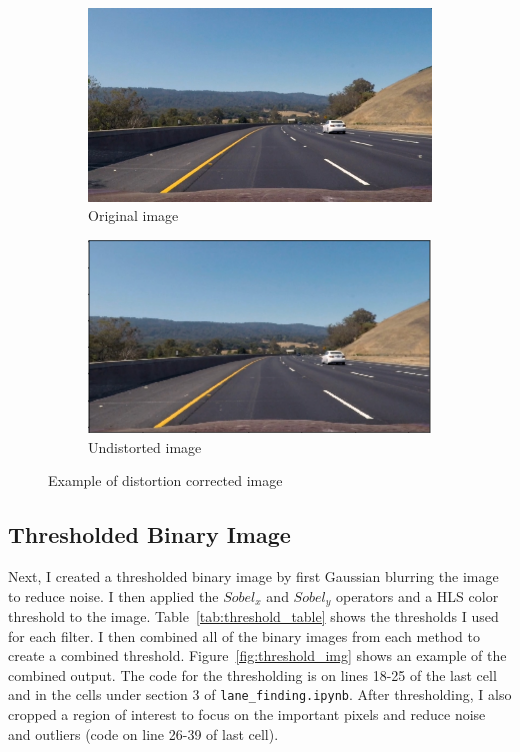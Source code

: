 \documentclass[12pt]{article}
\begin{document}
\begin{figure}[h]
\centering
\begin{subfigure}{.5\textwidth}
  \centering
  \includegraphics[width=1\linewidth]{test3.jpg}
  \caption{Original image}
\end{subfigure}%
\begin{subfigure}{.5\textwidth}
  \centering
  \includegraphics[width=1\linewidth]{undistorted_test.png}
  \caption{Undistorted image}
\end{subfigure}
\caption{Example of distortion corrected image}
\label{fig:undistorted_img}
\end{figure}

\subsection{Thresholded Binary Image}
Next, I created a thresholded binary image by first Gaussian blurring the image to reduce noise. I then applied the $Sobel_x$ and $Sobel_y$ operators and a HLS color threshold to the image. Table~\ref{tab:threshold_table} shows the thresholds I used for each filter. I then combined all of the binary images from each method to create a combined threshold. Figure~\ref{fig:threshold_img} shows an example of the combined output. The code for the thresholding is on lines 18-25 of the last cell and in the cells under section 3 of \texttt{lane\_finding.ipynb}. After thresholding, I also cropped a region of interest to focus on the important pixels and reduce noise and outliers (code on line 26-39 of last cell).
\end{document}
